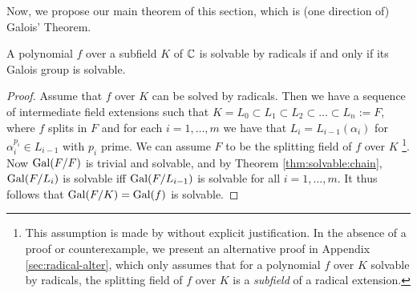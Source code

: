 Now, we propose our main theorem of this section, which is (one direction of) Galois' Theorem. 

\begin{theorem}\label{thm:galois-theorem}
	A polynomial $f$ over a subfield $K$ of $\mathbb C$ is solvable by radicals if and only if its Galois group is solvable.
\end{theorem}

\begin{proof}
	Assume that $f$ over $K$ can be solved by radicals. Then we have a sequence of intermediate field extensions such that $K = L_0 \subset L_1 \subset L_2 \subset ... \subset L_n :=F$, where $f$ splits in $F$ and for each $i = 1, \dots, m$ we have that  $L_i = L_{i-1} (\alpha_i)$ for $\alpha_i ^ {p_i} \in L_{i-1}$ with $p_i$ prime. We can assume $F$ to be the splitting field of $f$ over $K$ \footnote[2]{This assumption is made by \cite[p.~75]{introduction-to-galois-theory} without explicit justification. In the absence of a proof or counterexample, we present an alternative proof in Appendix \ref{sec:radical-alter}, which only assumes that for a polynomial $f$ over $K$ solvable by radicals, the splitting field of $f$ over $K$ is a \textit{subfield} of a radical extension.}.
Now $\operatorname{Gal}(F / F)$ is trivial and solvable, and by Theorem \ref{thm:solvable:chain}, $\operatorname{Gal}(F / L_i)$ is solvable iff $\operatorname{Gal}(F / L_{i-1})$ is solvable for all $i = 1, \dots, m$. It thus follows that $\operatorname{Gal}(F/ K) = \operatorname{Gal}(f)$ is solvable. 

\end{proof}
